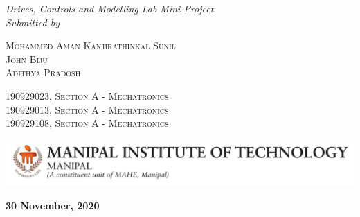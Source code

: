 \begin{titlepage}
    \begin{center}
        \textsc{\textbf{\Large{\thesistitle}}}
        
        \vspace{1.5cm}
        \textit{\large{Drives, Controls and Modelling Lab Mini Project}}\\
        
        
        \vspace{10cm}
        \textit{\large{Submitted by}}
        \vspace{1cm}
        \begin{flushleft}
        \begin{multicols}{2}
            \textsc{Mohammed Aman Kanjirathinkal Sunil}\\
            \textsc{John Biju}\\
            \textsc{Adithya Pradosh}
            
            \columnbreak
            \textsc{190929023, Section A - Mechatronics}\\
            \textsc{190929013, Section A - Mechatronics}\\
            \textsc{190929108, Section A - Mechatronics}
        \end{multicols}
        \end{flushleft}
        
        \vspace{3cm}
        {\includegraphics[height=0.09\textheight, width=1\textwidth]{Figures/mit.jpg}}
        
        \vspace{0.5cm}
        \textbf{30 November, 2020}
        
    \end{center}
\end{titlepage}